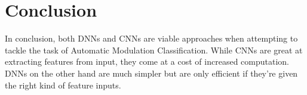 \documentclass[journal,onecolumn]{IEEEtran}
\begin{document}
\section{Conclusion}

In conclusion, both DNNs and CNNs are viable approaches when attempting to tackle the task of Automatic Modulation Classification. While CNNs are great at extracting features from input, they come at a cost of increased computation. DNNs on the other hand are much simpler but are only efficient if they're given the right kind of feature inputs.


\ifCLASSOPTIONcaptionsoff
  \newpage
\fi





%
%
%



% 





\end{document}
